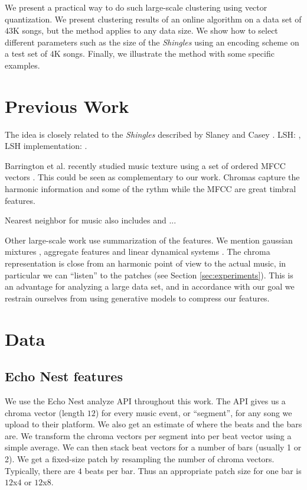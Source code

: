 \documentclass{article}
\begin{document}
We present a practical way to do such large-scale clustering using vector
quantization. We present clustering results of an online algorithm on a data 
set of $43$K songs, but the method applies to any data size. We show how to
select different parameters such as the size of the \textit{Shingles} 
using an encoding scheme on a test set of $4$K songs. Finally, we illustrate
the method with some specific examples.


\section{Previous Work}\label{sec:prevwork}
The idea is closely related to the \textit{Shingles} described by
Slaney and Casey \cite{Casey2006,Casey2007,Casey2008}. 
LSH: \cite{Datar2004}, LSH implementation: \cite{E2LSH}.

Barrington et al. recently studied music texture using a set of ordered
MFCC vectors \cite{Barrington2009a}. This could be seen as complementary
to our work. Chromas capture the harmonic information and some of the
rythm while the MFCC are great timbral features.

Nearest neighbor for music also includes \cite{Cano2004} and ...

Other large-scale work use summarization of the features. We mention 
gaussian mixtures \cite{Mandel2005}, aggregate features \cite{Bergstra2006a}
and linear dynamical systems \cite{Barrington2009a}. The chroma representation
is close from an harmonic point of view to the actual music, in particular
we can ``listen'' to the patches (see Section \ref{sec:experiments}).
This is an advantage for analyzing a large data set, and in accordance with our goal
we restrain ourselves from using generative models to compress our features.


\section{Data}\label{sec:data}

\subsection{Echo Nest features}
We use the Echo Nest analyze API \cite{EchoNest} throughout this work.
The API gives us a chroma vector (length $12$) for every music event, 
or ``segment'', for any song we upload to their platform. 
We also get an estimate of where the beats and the bars are. 
We transform the chroma vectors per segment into per beat vector using a 
simple average. We can then stack beat vectors for a number of bars (usually 1 or 2). 
We get a fixed-size patch by resampling the number of chroma vectors. Typically,
there are $4$ beats per bar. Thus an appropriate patch size for one bar
is $12$x$4$ or $12$x$8$.
\end{document}
